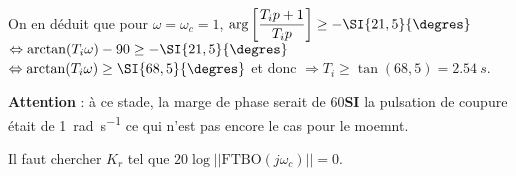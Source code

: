 \ifprof
\begin{corrige}
On en déduit que pour $\omega=\omega_c=1$, 
$\arg \left[  \dfrac{T_i p+1}{T_i p}  \right] \geq - \SI{21,5}{\degres}$
$ \Leftrightarrow  \arctan (T_i \omega) -90 \geq - \SI{21,5}{\degres}$ 
$ \Leftrightarrow  \arctan (T_i \omega)  \geq \SI{68,5}{\degres}$ 
et donc $\Rightarrow  T_i \geq \tan(68,5)=\SI{2,54}{s}$.
 

 \begin{warn}
\textbf{Attention} : à ce stade, la marge de phase serait de 60\degres  \textbf{SI} la pulsation de coupure était de \SI{1}{rad.s^{-1}} ce qui n'est pas encore le cas pour le moemnt.
 \end{warn}
 
\end{corrige}
\else
\fi



\begin{methode}
Il faut chercher $K_r$ tel que $20\log||\text{FTBO}(j\omega_c)||=0$.
\end{methode}
\ifprof


